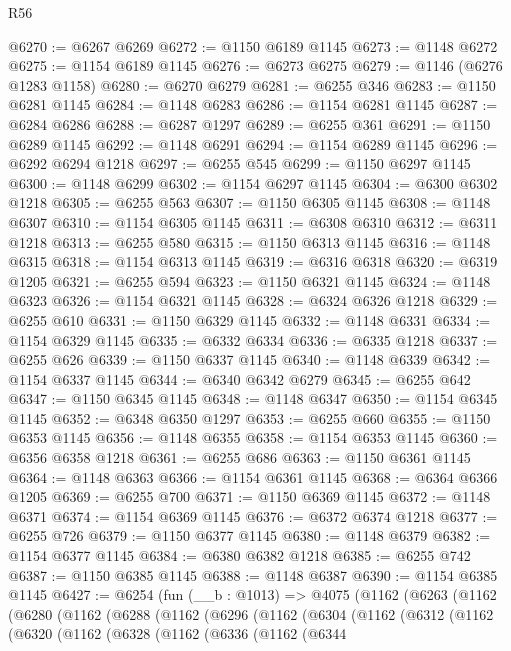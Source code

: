 \begin{lexlean}{R56}
\begin{coremodule}
@6270 := @6267 @6269
@6272 := @1150 @6189 @1145
@6273 := @1148 @6272
@6275 := @1154 @6189 @1145
@6276 := @6273 @6275
@6279 := @1146 (@6276 @1283 @1158)
@6280 := @6270 @6279
@6281 := @6255 @346
@6283 := @1150 @6281 @1145
@6284 := @1148 @6283
@6286 := @1154 @6281 @1145
@6287 := @6284 @6286
@6288 := @6287 @1297
@6289 := @6255 @361
@6291 := @1150 @6289 @1145
@6292 := @1148 @6291
@6294 := @1154 @6289 @1145
@6296 := @6292 @6294 @1218
@6297 := @6255 @545
@6299 := @1150 @6297 @1145
@6300 := @1148 @6299
@6302 := @1154 @6297 @1145
@6304 := @6300 @6302 @1218
@6305 := @6255 @563
@6307 := @1150 @6305 @1145
@6308 := @1148 @6307
@6310 := @1154 @6305 @1145
@6311 := @6308 @6310
@6312 := @6311 @1218
@6313 := @6255 @580
@6315 := @1150 @6313 @1145
@6316 := @1148 @6315
@6318 := @1154 @6313 @1145
@6319 := @6316 @6318
@6320 := @6319 @1205
@6321 := @6255 @594
@6323 := @1150 @6321 @1145
@6324 := @1148 @6323
@6326 := @1154 @6321 @1145
@6328 := @6324 @6326 @1218
@6329 := @6255 @610
@6331 := @1150 @6329 @1145
@6332 := @1148 @6331
@6334 := @1154 @6329 @1145
@6335 := @6332 @6334
@6336 := @6335 @1218
@6337 := @6255 @626
@6339 := @1150 @6337 @1145
@6340 := @1148 @6339
@6342 := @1154 @6337 @1145
@6344 := @6340 @6342 @6279
@6345 := @6255 @642
@6347 := @1150 @6345 @1145
@6348 := @1148 @6347
@6350 := @1154 @6345 @1145
@6352 := @6348 @6350 @1297
@6353 := @6255 @660
@6355 := @1150 @6353 @1145
@6356 := @1148 @6355
@6358 := @1154 @6353 @1145
@6360 := @6356 @6358 @1218
@6361 := @6255 @686
@6363 := @1150 @6361 @1145
@6364 := @1148 @6363
@6366 := @1154 @6361 @1145
@6368 := @6364 @6366 @1205
@6369 := @6255 @700
@6371 := @1150 @6369 @1145
@6372 := @1148 @6371
@6374 := @1154 @6369 @1145
@6376 := @6372 @6374 @1218
@6377 := @6255 @726
@6379 := @1150 @6377 @1145
@6380 := @1148 @6379
@6382 := @1154 @6377 @1145
@6384 := @6380 @6382 @1218
@6385 := @6255 @742
@6387 := @1150 @6385 @1145
@6388 := @1148 @6387
@6390 := @1154 @6385 @1145
@6427 := @6254
    (fun (__b : @1013) =>
    @4075
      (@1162
        (@6263
          (@1162
            (@6280
              (@1162
                (@6288
                  (@1162
                    (@6296
                      (@1162
                        (@6304
                          (@1162
                            (@6312
                              (@1162
                                (@6320
                                  (@1162
                                    (@6328
                                      (@1162
                                        (@6336
                                          (@1162
                                            (@6344

\end{coremodule}
\end{lexlean}

